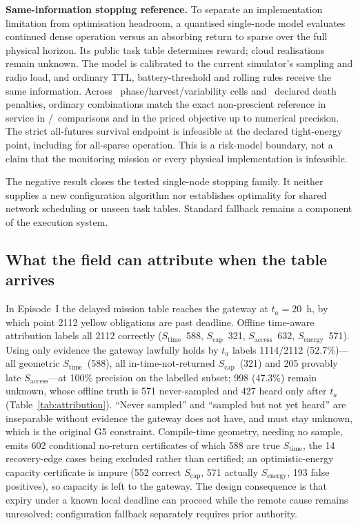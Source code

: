 \documentclass[journal,10pt]{IEEEtran}
\newcommand{\stime}{$S_{\mathrm{time}}$\xspace}
\newcommand{\scap}{$S_{\mathrm{cap}}$\xspace}
\newcommand{\senergy}{$S_{\mathrm{energy}}$\xspace}
\newcommand{\saccess}{$S_{\mathrm{access}}$\xspace}
\begin{document}
\textbf{Same-information stopping reference.} To separate an implementation limitation from
optimisation headroom, a quantised single-node model evaluates continued dense operation versus
an absorbing return to sparse over the full physical horizon. Its public task table determines
reward; cloud realisations remain unknown. The model is calibrated to the current simulator's
sampling and radio load, and ordinary TTL, battery-threshold and rolling rules receive the same
information. Across \cNineCells\ phase/harvest/variability cells and \cNineWeights\ declared death
penalties, ordinary combinations match the exact non-prescient reference in service in
\cNineServiceMatches/\cNineComparisons\ comparisons and in the priced objective up to numerical
precision. The strict all-futures survival endpoint is infeasible at the declared tight-energy
point, including for all-sparse operation. This is a risk-model boundary, not a claim that the
monitoring mission or every physical implementation is infeasible.

The negative result closes the tested single-node stopping family. It neither supplies a new
configuration algorithm nor establishes optimality for shared network scheduling or unseen task
tables. Standard fallback remains a component of the execution system.

\subsection{What the field can attribute when the table arrives}
\label{sec:eval-attr}
In Episode~I the delayed mission table reaches the gateway at $t_a{=}20$~h, by which point 2112
yellow obligations are past deadline. Offline time-aware attribution labels all 2112 correctly
(\stime\ 588, \scap\ 321, \saccess\ 632, \senergy\ 571). Using only evidence the gateway lawfully
holds by $t_a$ labels 1114/2112 (52.7\%)---all geometric \stime\ (588), all in-time-not-returned
\scap\ (321) and 205 provably late \saccess---at 100\% precision on the labelled subset; 998
(47.3\%) remain unknown, whose offline truth is 571 never-sampled and 427 heard only after $t_a$
(Table~\ref{tab:attribution}). ``Never sampled'' and ``sampled but not yet heard'' are inseparable
without evidence the gateway does not have, and must stay unknown, which is the original G5
constraint. Compile-time geometry, needing no sample, emits 602 conditional no-return certificates
of which 588 are true \stime, the 14 recovery-edge cases being excluded rather than certified; an
optimistic-energy capacity certificate is impure (552 correct \scap, 571 actually \senergy, 193
false positives), so capacity is left to the gateway. The design consequence is that expiry under a known local deadline can proceed while the
remote cause remains unresolved; configuration fallback separately requires prior authority.
\end{document}
